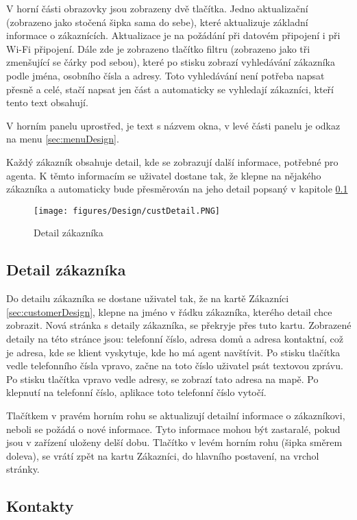 \documentclass[11pt,twoside,a4paper]{book}
\begin{document}
V horní části obrazovky jsou zobrazeny dvě tlačítka. Jedno aktualizační (zobrazeno jako stočená šipka sama do sebe), které aktualizuje základní informace o zákaznících. Aktualizace je na požádání při datovém připojení i při Wi-Fi připojení. Dále zde je zobrazeno tlačítko filtru (zobrazeno jako tři zmenšující se čárky pod sebou), které po stisku zobrazí vyhledávání zákazníka podle jména, osobního čísla a adresy. Toto vyhledávání není potřeba napsat přesně a celé, stačí napsat jen část a automaticky se vyhledají zákazníci, kteří tento text obsahují.

V horním panelu uprostřed, je text s názvem okna, v levé části panelu je odkaz na menu \ref{sec:menuDesign}.

Každý zákazník obsahuje detail, kde se zobrazují další informace, potřebné pro agenta. K těmto informacím se uživatel dostane tak, že klepne na nějakého zákazníka a automaticky bude přesměrován na jeho detail popsaný v kapitole \ref{sec:custDetailDesign}
\newpage
\begin{wrapfigure}[14]{l}{0.2\textwidth}
	\centering
	\texttt{[image: figures/Design/custDetail.PNG]}
	\caption{Detail zákazníka}
	\label{fig:customerdetailscreens}
	\end{wrapfigure}

\subsection{Detail zákazníka} \label{sec:custDetailDesign}
Do detailu zákazníka se dostane uživatel tak, že na kartě Zákazníci \ref{sec:customerDesign}, klepne na jméno v řádku zákazníka, kterého detail chce zobrazit. Nová stránka s detaily zákazníka, se překryje přes tuto kartu. Zobrazené detaily na této stránce jsou: telefonní číslo, adresa domů a adresa kontaktní, což je adresa, kde se klient vyskytuje, kde ho má agent navštívit. Po stisku tlačítka vedle telefonního čísla vpravo, začne na toto číslo uživatel psát textovou zprávu. Po stisku tlačítka vpravo vedle adresy, se zobrazí tato adresa na mapě. Po klepnutí na telefonní číslo, aplikace toto telefonní číslo vytočí. 

Tlačítkem v pravém horním rohu se aktualizují detailní informace o zákazníkovi, neboli se požádá o nové informace. Tyto informace mohou být zastaralé, pokud jsou v zařízení uloženy delší dobu. Tlačítko v levém horním rohu (šipka směrem doleva), se vrátí zpět na kartu Zákazníci, do hlavního postavení, na vrchol stránky. 
 
\subsection{Kontakty}
\end{document}
